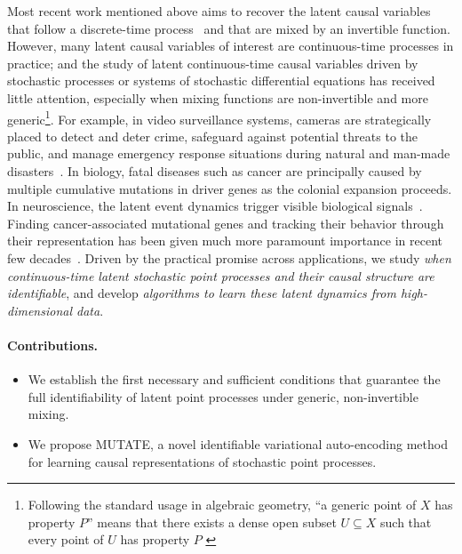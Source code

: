 \documentclass[10pt]{article}
\numberwithin{figure}{section}
\begin{document}
Most recent work mentioned above aims to recover the latent causal variables that follow a discrete-time process~\citep{yao_temporally_2022,song_temporally_2023} and that are mixed by an invertible function. However, many latent causal variables of interest are continuous-time processes in practice; and the study of latent continuous-time causal variables driven by stochastic processes or systems of stochastic differential equations has received little attention, especially when mixing functions are non-invertible and more generic\footnote{Following the standard usage in algebraic geometry, “a generic point of $X$ has property $P$” means that there exists a dense open subset $U \subseteq X$ such that every point of $U$ has property $P$ 
\citep[see][Ch.~I]{EisenbudHarris2000}}. For example, in video surveillance systems, cameras are strategically placed to detect and deter crime, safeguard against potential threats to the public, and manage emergency response situations during natural and man-made disasters~\citep{lima_granger_2020,bacry_hawkes_2014,bacry_non-parametric_2012}. In biology, fatal diseases such as cancer are principally caused by multiple cumulative mutations in driver genes as the colonial expansion proceeds. In neuroscience, the latent event dynamics trigger visible biological signals~\citep{reynaud-bouret_adaptive_2010,pmlr-v238-lorch24a}. Finding cancer-associated mutational genes and tracking their behavior through their representation has been given much more paramount importance in recent few decades~\citep{torkamani_identification_2009,bailey_comprehensive_2018,nourbakhsh_prediction_2024}. Driven by the practical promise across applications, we study \emph{when continuous-time latent stochastic point processes and their causal structure are identifiable}, and develop \emph{algorithms to learn these latent dynamics from high-dimensional data}.

\paragraph{Contributions.}
\begin{itemize}
    \item We establish the first necessary and sufficient conditions that guarantee the full identifiability of latent point processes under generic, non-invertible mixing.
    \item We propose MUTATE, a novel identifiable variational auto-encoding method for learning causal representations of stochastic point processes.
\end{itemize}
\end{document}
